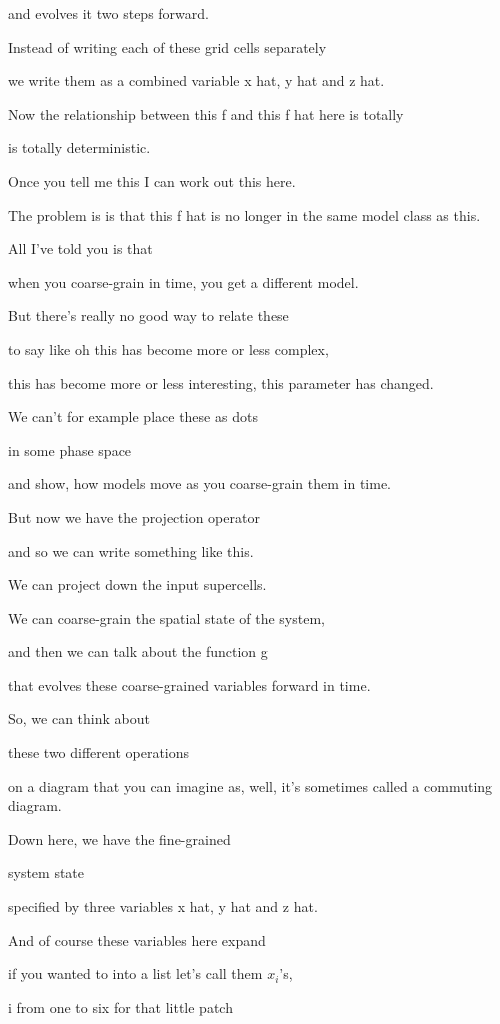 \documentclass[]{article}
\begin{document}
and evolves it two steps forward.

Instead of writing each of these grid cells separately

we write them as a combined variable
x hat, y hat and z hat.

Now the relationship between this f and this f hat here is totally

is totally deterministic.

Once you tell me this
I can work out this here.

The problem is is that this f hat is no longer
in the same model class as this.

All I've told you is that

when you coarse-grain in time,
you get a different model.

But there's really no good way to relate these

to say like oh this has become more or less complex,

this has become more or less interesting,
this parameter has changed.

We can't for example place these as dots

in some phase space

and show, how models move
as you coarse-grain them in time.

But now we have the projection operator

and so we can write
something like this.

We can project down
the input supercells.

We can coarse-grain the spatial state of the system,

and then we can talk about
the function g

that evolves these coarse-grained variables forward in time.

So, we can think about

these two different operations

on a diagram that you can imagine as, well,
it's sometimes called a commuting diagram.

Down here, we have the fine-grained

system state

specified by three variables x hat, y hat and z hat.

And of course these variables here expand

if you wanted to into a list let's call them $x_i$'s,

i from one to six for that little patch
\end{document}
